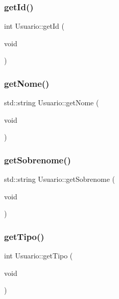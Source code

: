 \mbox{\label{class_usuario_a71fe841133c88c6f2c71a5225fd1cd5c}} 
\subsubsection{get\+Id()}
{\footnotesize\ttfamily int Usuario\+::get\+Id (\begin{DoxyParamCaption}\item[{void}]{ }\end{DoxyParamCaption})\hspace{0.3cm}{\ttfamily [inline]}}

\mbox{\label{class_usuario_a95cd963206ebacf43b033af966ef9a87}} 
\subsubsection{get\+Nome()}
{\footnotesize\ttfamily std\+::string Usuario\+::get\+Nome (\begin{DoxyParamCaption}\item[{void}]{ }\end{DoxyParamCaption})\hspace{0.3cm}{\ttfamily [inline]}}

\mbox{\label{class_usuario_ae8583289766b839e0357790d7d7f0353}} 
\subsubsection{get\+Sobrenome()}
{\footnotesize\ttfamily std\+::string Usuario\+::get\+Sobrenome (\begin{DoxyParamCaption}\item[{void}]{ }\end{DoxyParamCaption})\hspace{0.3cm}{\ttfamily [inline]}}

\mbox{\label{class_usuario_aa9b69560e3322320e873d4411927defb}} 
\subsubsection{get\+Tipo()}
{\footnotesize\ttfamily int Usuario\+::get\+Tipo (\begin{DoxyParamCaption}\item[{void}]{ }\end{DoxyParamCaption})\hspace{0.3cm}{\ttfamily [inline]}}

